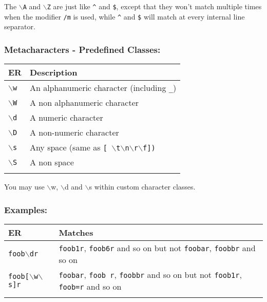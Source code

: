 The \texttt{$\backslash$A} and \texttt{$\backslash$Z} are just like
\texttt{\^{}} and \texttt{\$}, except that they won't match multiple
times when the modifier \texttt{/m} is used, while \texttt{\^{}} and
\texttt{\$} will match at every internal line separator.


\subsubsection{Metacharacters - Predefined Classes:}

\begin{footnotesize}
  \begin{tabularx}{\textwidth}{>{\hsize=0.3\hsize}X>{\hsize=0.7\hsize}X}\\
    \hline
    \textbf{ER} & \textbf{Description} \\
    \hline
    \texttt{$\backslash$w} & An alphanumeric character (including \texttt{\_}) \\
    \hline
    \texttt{$\backslash$W} & A non alphanumeric character \\
    \texttt{$\backslash$d} & A numeric character \\
    \texttt{$\backslash$D} & A non-numeric character \\
    \texttt{$\backslash$s} & Any space (same as \texttt{[ $\backslash$t$\backslash$n$\backslash$r$\backslash$f])} \\
    \texttt{$\backslash$S} & A non space \\
    \hline
    \\
  \end{tabularx}
\end{footnotesize}

You may use $\backslash$w, $\backslash$d and $\backslash$s within
custom character classes.


\subsubsection{Examples:}

\begin{footnotesize}
  \begin{tabularx}{\textwidth}{>{\hsize=0.2\hsize}X>{\hsize=0.9\hsize}X}\\
    \hline
    \textbf{ER} & \textbf{Matches} \\
    \hline
    \texttt{foob$\backslash$dr} & \texttt{foob1r}, \texttt{foob6r} and so on but not \texttt{foobar}, \texttt{foobbr} and so on \\
    \texttt{foob[$\backslash$w$\backslash$s]r} & \texttt{foobar}, \texttt{foob r}, \texttt{foobbr} and so on but not \texttt{foob1r}, \texttt{foob=r} and so on \\
    \hline
    \\
  \end{tabularx}
\end{footnotesize}

